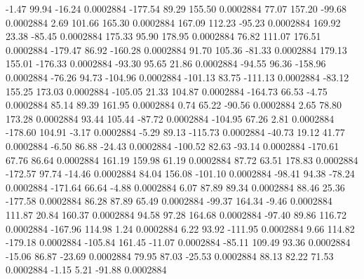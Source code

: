        -1.47       99.94      -16.24     0.0002884
     -177.54       89.29      155.50     0.0002884
       77.07      157.20      -99.68     0.0002884
        2.69      101.66      165.30     0.0002884
      167.09      112.23      -95.23     0.0002884
      169.92       23.38      -85.45     0.0002884
      175.33       95.90      178.95     0.0002884
       76.82      111.07      176.51     0.0002884
     -179.47       86.92     -160.28     0.0002884
       91.70      105.36      -81.33     0.0002884
      179.13      155.01     -176.33     0.0002884
      -93.30       95.65       21.86     0.0002884
      -94.55       96.36     -158.96     0.0002884
      -76.26       94.73     -104.96     0.0002884
     -101.13       83.75     -111.13     0.0002884
      -83.12      155.25      173.03     0.0002884
     -105.05       21.33      104.87     0.0002884
     -164.73       66.53       -4.75     0.0002884
       85.14       89.39      161.95     0.0002884
        0.74       65.22      -90.56     0.0002884
        2.65       78.80      173.28     0.0002884
       93.44      105.44      -87.72     0.0002884
     -104.95       67.26        2.81     0.0002884
     -178.60      104.91       -3.17     0.0002884
       -5.29       89.13     -115.73     0.0002884
      -40.73       19.12       41.77     0.0002884
       -6.50       86.88      -24.43     0.0002884
     -100.52       82.63      -93.14     0.0002884
     -170.61       67.76       86.64     0.0002884
      161.19      159.98       61.19     0.0002884
       87.72       63.51      178.83     0.0002884
     -172.57       97.74      -14.46     0.0002884
       84.04      156.08     -101.10     0.0002884
      -98.41       94.38      -78.24     0.0002884
     -171.64       66.64       -4.88     0.0002884
        6.07       87.89       89.34     0.0002884
       88.46       25.36     -177.58     0.0002884
       86.28       87.89       65.49     0.0002884
      -99.37      164.34       -9.46     0.0002884
      111.87       20.84      160.37     0.0002884
       94.58       97.28      164.68     0.0002884
      -97.40       89.86      116.72     0.0002884
     -167.96      114.98        1.24     0.0002884
        6.22       93.92     -111.95     0.0002884
        9.66      114.82     -179.18     0.0002884
     -105.84      161.45      -11.07     0.0002884
      -85.11      109.49       93.36     0.0002884
      -15.06       86.87      -23.69     0.0002884
       79.95       87.03      -25.53     0.0002884
       88.13       82.22       71.53     0.0002884
       -1.15        5.21      -91.88     0.0002884
